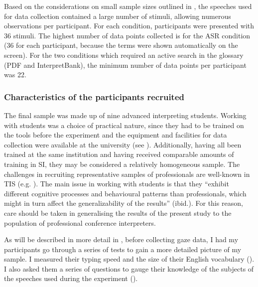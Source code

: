 \begin{sloppypar}
Based on the considerations on small sample sizes outlined in , the speeches used for data collection contained a large number of stimuli, allowing numerous observations per participant. For each condition, participants were presented with 36 stimuli. The highest number of data points collected is for the ASR condition (36 for each participant, because the terms were shown automatically on the screen). For the two conditions which required an active search in the glossary (PDF and InterpretBank), the minimum number of data points per participant was 22.
\subsubsection{Characteristics of the participants recruited} \label{sample_characteristics}
The final sample was made up of nine advanced interpreting students. Working with students was a choice of practical nature, since they had to be trained on the tools before the experiment and the equipment and facilities for data collection were available at the university (see ). Additionally, having all been trained at the same institution and having received comparable amounts of training in SI, they may be considered a relatively homogeneous sample. The challenges in recruiting representative samples of professionals are well-known in TIS (e.g. \citealt{hansen-schirra_translation_2020}). The main issue in working with students is that they ``exhibit different cognitive processes and behavioural patterns than professionals, which might in turn affect the generalizability of the results'' (ibid.). For this reason, care should be taken in generalising the results of the present study to the population of professional conference interpreters.
\end{sloppypar}

As will be described in more detail in , before collecting gaze data, I had my participants go through a series of tests to gain a more detailed picture of my sample. I measured their typing speed and the size of their English vocabulary (). I also asked them a series of questions to gauge their knowledge of the subjects of the speeches used during the experiment ().

